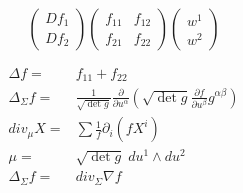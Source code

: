 \documentclass{ctexart}
\begin{document}
\begin{minipage}[t]{.5\textwidth}
$$
\begin{pmatrix}
Df_1\\Df_2
\end{pmatrix}
\begin{pmatrix}
f_{11} & f_{12} \\
f_{21} & f_{22}
\end{pmatrix}
\begin{pmatrix}
w^1\\w^2
\end{pmatrix}
$$

\begin{equation*}
\begin{aligned}
\Delta f=&f_{11}+f_{22}\\
\Delta_{\Sigma}f=&\frac{1}{\sqrt{\det g}}\frac{\partial}{\partial u^{\alpha}}\left(\sqrt{\det g} \frac{\partial f}{\partial u^{\beta}}g^{\alpha\beta}\right)\\
div_{\mu}X=&\sum \frac{1}{f} \partial_i(fX^i)\\
\mu=&\sqrt{\det g}\; du^1\!\!\wedge du^2\\
\Delta_{\Sigma}f=& div_{\Sigma} \nabla f
\end{aligned}
\end{equation*}

\end{minipage}
\end{document}
